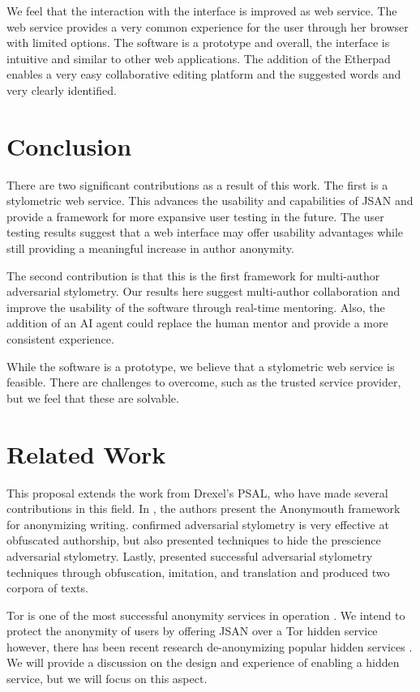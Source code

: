 \documentclass[letterpaper]{article}
\begin{document}
We feel that the interaction with the interface is improved as web
service.  The web service provides a very common experience for the
user through her browser with limited options.  The software is a
prototype and overall, the interface is intuitive and similar to other
web applications.  The addition of the Etherpad enables a very easy
collaborative editing platform and the suggested words and very
clearly identified.

\section{Conclusion}

There are two significant contributions as a result of this work.  The
first is a stylometric web service.  This advances the usability
and capabilities of JSAN and provide a framework for more expansive
user testing in the future. The user testing results suggest that a
web interface may offer usability advantages while still providing a
meaningful increase in author anonymity.


The second contribution is that this is the first framework for
multi-author adversarial stylometry.  Our results here suggest
multi-author collaboration and improve the usability of the software
through real-time mentoring.  Also, the addition of an AI agent could
replace the human mentor and provide a more consistent experience.

While the software is a prototype, we believe that a stylometric web
service is feasible.  There are challenges to overcome, such as the
trusted service provider, but we feel that these are solvable.

\section*{Related Work}\label{sec:related}
This proposal extends the work from Drexel's PSAL, who have made
several contributions in this field.  In
\cite{conf/pet/McDonaldACSG12}, the authors present the Anonymouth
framework for anonymizing writing.
\cite{Afroz:2012:DHF:2310656.2310711} confirmed adversarial stylometry
is very effective at obfuscated authorship, but also presented
techniques to hide the prescience adversarial stylometry.  Lastly,
\cite{journals/tissec/BrennanAG12} presented successful adversarial
stylometry techniques through obfuscation, imitation, and translation
and produced two corpora of texts.

Tor is one of the most successful anonymity services in
operation \cite{Dingledine04tor:the}.  We intend to protect the
anonymity of users by offering JSAN over a Tor hidden service
however, there has been recent research de-anonymizing popular hidden
services \cite{oakland2013-trawling}.  We will provide a discussion on
the design and experience of enabling a hidden service, but we will
focus on this aspect.
\end{document}
